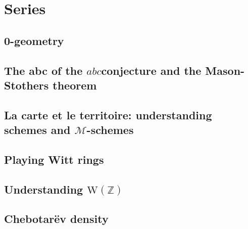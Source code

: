 \documentclass[a4paper]{memoir}
\begin{document}
\part{Series}

\chapter{0-geometry}
\label{chapter:prep-notes}






\chapter{The abc of the \texorpdfstring{$abc$}-conjecture and the Mason-Stothers theorem}





\chapter{La carte et le territoire: understanding schemes and \texorpdfstring{$\mathcal{M}$}{M}-schemes}








\chapter{Playing Witt rings}





\chapter{Understanding \texorpdfstring{$\mathrm{W}(\mathbb{Z})$}{W(Z)}}






\chapter{Chebotar\"ev density}


\end{document}
